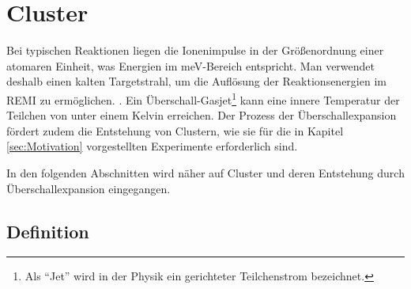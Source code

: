 \section{Cluster} \label{sec:Cluster}

Bei typischen Reaktionen liegen die Ionenimpulse in der Größenordnung einer atomaren Einheit, was  Energien im meV-Bereich entspricht. Man verwendet deshalb einen kalten Targetstrahl, um die Auflösung der Reaktionsenergien im REMI zu ermöglichen. \cite{kurka07}. Ein Überschall-Gasjet\footnote{Als \enquote{Jet} wird in der Physik ein gerichteter Teilchenstrom bezeichnet.} kann eine innere Temperatur der Teilchen von unter einem Kelvin erreichen. Der Prozess der Überschallexpansion fördert zudem die Entstehung von Clustern, wie sie für die in Kapitel \ref{sec:Motivation} vorgestellten Experimente erforderlich sind.

In den folgenden Abschnitten wird näher auf Cluster und deren Entstehung durch Überschallexpansion eingegangen.


\subsection{Definition}

